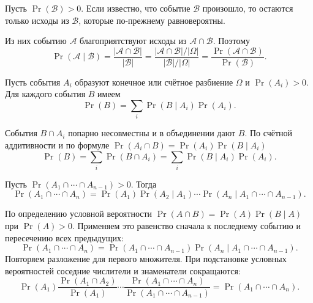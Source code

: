 \begin{Proof}

Пусть $\Pr(\mathcal{B}) > 0$. Если известно, что событие
$\mathcal{B}$ произошло, то остаются только исходы из
$\mathcal{B}$, которые по-прежнему равновероятны.

\smallskip
Из них событию $\mathcal{A}$ благоприятствуют исходы
из $\mathcal{A} \cap \mathcal{B}$. Поэтому
\[
    \Pr(\mathcal{A} \mid \mathcal{B})
    =
    \frac{|\mathcal{A} \cap \mathcal{B}|}{|\mathcal{B}|}
    =
    \frac{
        |\mathcal{A} \cap \mathcal{B}| / |\Omega|
    }{
        |\mathcal{B}| / |\Omega|
    }
    =
    \frac{\Pr(\mathcal{A} \cap \mathcal{B})}{\Pr(\mathcal{B})}.
\]
\end{Proof}


\begin{theorem}
Пусть события $A_i$ образуют конечное или счётное разбиение $\Omega$ и $\Pr(A_i)>0$. Для каждого события $B$ имеем
\[
 \Pr(B)=\sum_i \Pr(B\mid A_i)\Pr(A_i).
\]
\end{theorem}
\begin{Proof}
События $B\cap A_i$ попарно несовместны и в объединении дают $B$.
По счётной аддитивности и по формуле $\Pr(A_i\cap B)=\Pr(A_i)\Pr(B\mid A_i)$
\[
  \Pr(B)=\sum_i\Pr(B\cap A_i)=\sum_i\Pr(B\mid A_i)\Pr(A_i).
\]
\end{Proof}

\begin{theorem}
Пусть $\Pr(A_1\cap\cdots\cap A_{n-1})>0$. Тогда
\[
 \Pr(A_1\cap\cdots\cap A_n)
 =\Pr(A_1)\Pr(A_2\mid A_1)\cdots\Pr(A_n\mid A_1\cap\cdots\cap A_{n-1}).
\]
\end{theorem}

\begin{Proof}
По определению условной вероятности $\Pr(A\cap B)=\Pr(A)\Pr(B\mid A)$ при $\Pr(A)>0$. Применяем это равенство сначала к последнему событию и пересечению всех предыдущих:
\[
\Pr(A_1\cap\cdots\cap A_n)
=\Pr(A_1\cap\cdots\cap A_{n-1})
 \Pr(A_n\mid A_1\cap\cdots\cap A_{n-1}).
\]
Повторяем разложение для первого множителя. При подстановке условных вероятностей соседние числители и знаменатели сокращаются:
\[
 \Pr(A_1)\frac{\Pr(A_1\cap A_2)}{\Pr(A_1)}
 \cdots\frac{\Pr(A_1\cap\cdots\cap A_n)}{\Pr(A_1\cap\cdots\cap A_{n-1})}
 =\Pr(A_1\cap\cdots\cap A_n).
\]
\end{Proof}

